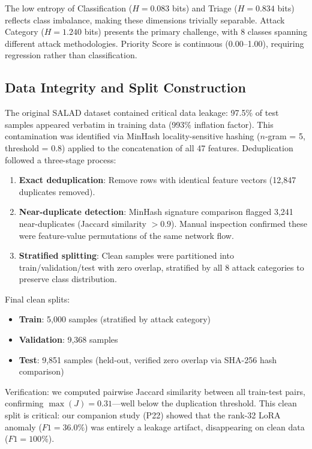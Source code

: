 \documentclass[journal]{IEEEtran}
\begin{document}
The low entropy of Classification ($H=0.083$ bits) and Triage ($H=0.834$ bits) reflects class imbalance, making these dimensions trivially separable. Attack Category ($H=1.240$ bits) presents the primary challenge, with 8 classes spanning different attack methodologies. Priority Score is continuous (0.00--1.00), requiring regression rather than classification.

\subsection{Data Integrity and Split Construction}
The original SALAD dataset contained critical data leakage: 97.5\% of test samples appeared verbatim in training data (993\% inflation factor). This contamination was identified via MinHash locality-sensitive hashing ($n$-gram = 5, threshold = 0.8) applied to the concatenation of all 47 features. Deduplication followed a three-stage process:

\begin{enumerate}
\item \textbf{Exact deduplication}: Remove rows with identical feature vectors (12,847 duplicates removed).
\item \textbf{Near-duplicate detection}: MinHash signature comparison flagged 3,241 near-duplicates (Jaccard similarity $> 0.9$). Manual inspection confirmed these were feature-value permutations of the same network flow.
\item \textbf{Stratified splitting}: Clean samples were partitioned into train/validation/test with zero overlap, stratified by all 8 attack categories to preserve class distribution.
\end{enumerate}

Final clean splits:
\begin{itemize}
\item \textbf{Train}: 5,000 samples (stratified by attack category)
\item \textbf{Validation}: 9,368 samples
\item \textbf{Test}: 9,851 samples (held-out, verified zero overlap via SHA-256 hash comparison)
\end{itemize}

Verification: we computed pairwise Jaccard similarity between all train-test pairs, confirming $\max(J) = 0.31$---well below the duplication threshold. This clean split is critical: our companion study (P22) showed that the rank-32 LoRA anomaly ($F1 = 36.0\%$) was entirely a leakage artifact, disappearing on clean data ($F1 = 100\%$).
\end{document}
